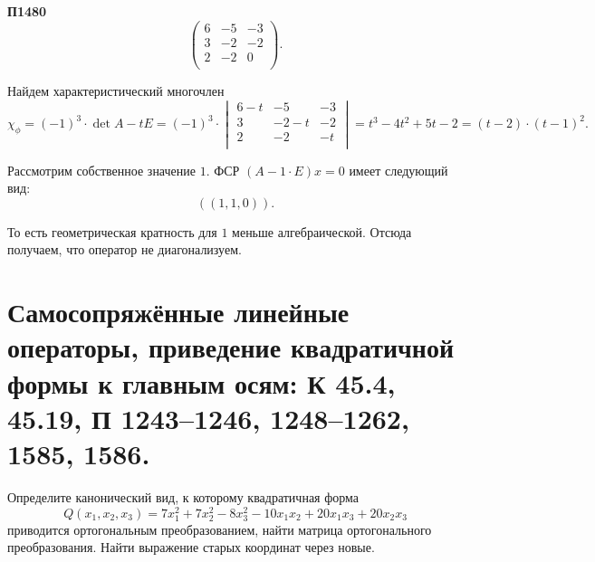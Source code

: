 \documentclass[a4paper]{article}
\begin{document}
\begin{options}
    \item[\textbf{П1480}]
        \begin{equation*}
            \begin{pmatrix}
                6 & -5 & -3 \\
                3 & -2 & -2 \\
                2 & -2 & 0 \\
            \end{pmatrix}.
        \end{equation*}

        \begin{solution}
            Найдем характеристический многочлен
            \begin{equation*}
                \chi_{\phi} = (-1)^{3} \cdot \det{A - tE} = 
                (-1)^3 \cdot
                \begin{vmatrix}
                    6 - t & -5 & -3 \\
                    3 & -2 - t & -2 \\
                    2 & -2 & -t \\
                \end{vmatrix}
                = t^3 - 4t^2 + 5t - 2
                = (t - 2) \cdot (t - 1)^2.
            \end{equation*}

            Рассмотрим собственное значение $1$. ФСР $(A - 1 \cdot E) x = 0$ имеет следующий вид:
            \begin{equation*}
                ((1, 1, 0)).
            \end{equation*}

            То есть геометрическая кратность для $1$ меньше алгебраической. Отсюда получаем, что оператор не диагонализуем.
        \end{solution}
    \end{options}
     
    \newpage
    \section{Самосопряжённые линейные операторы, приведение квадратичной формы к главным осям: К 45.4, 45.19, П 1243–1246, 1248–1262, 1585, 1586.}

    Определите канонический вид, к которому квадратичная форма
    \begin{equation*}
        Q(x_1, x_2, x_3) = 7x_1^2 + 7x_2^2 - 8x_3^2 - 10x_1x_2 + 20x_1x_3 + 20x_2x_3
    \end{equation*}
    приводится ортогональным преобразованием, найти матрица ортогонального преобразования. Найти выражение старых координат через новые.
\end{document}
